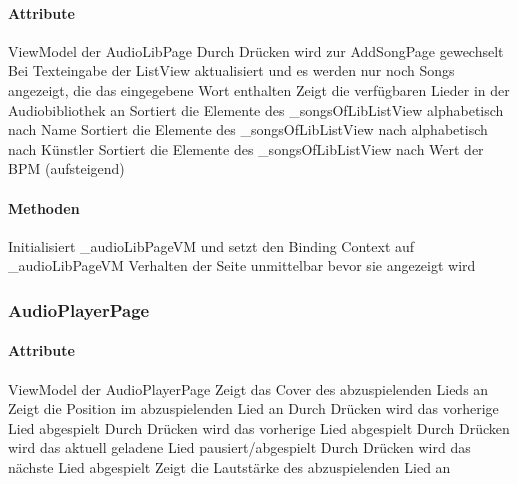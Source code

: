 \documentclass[../entwurf.tex]{subfiles}
\begin{document}
\paragraph{Attribute}
\begin{itemize}
	 ViewModel der AudioLibPage
	 Durch Drücken wird zur AddSongPage gewechselt
	 Bei Texteingabe der ListView aktualisiert und es werden nur noch Songs angezeigt, die das eingegebene Wort enthalten
	 Zeigt die verfügbaren Lieder in der Audiobibliothek an
	 Sortiert die Elemente des \_songsOfLibListView alphabetisch nach Name
	 Sortiert die Elemente des \_songsOfLibListView nach alphabetisch nach Künstler
	 Sortiert die Elemente des \_songsOfLibListView nach Wert der BPM (aufsteigend)
\end{itemize}

\paragraph{Methoden}
\begin{itemize}
	 Initialisiert \_audioLibPageVM und setzt den Binding Context 			auf \_audioLibPageVM
	 Verhalten der Seite unmittelbar bevor sie angezeigt wird
\end{itemize}

\subsubsection{AudioPlayerPage}

\paragraph{Attribute}
\begin{itemize}
	 ViewModel der AudioPlayerPage
	 Zeigt das Cover des abzuspielenden Lieds an
	 Zeigt die Position im abzuspielenden Lied an
	 Durch Drücken wird das vorherige Lied abgespielt
	 Durch Drücken wird das vorherige Lied abgespielt
	 Durch Drücken wird das aktuell geladene Lied pausiert/abgespielt
	 Durch Drücken wird das nächste Lied abgespielt	
	 Zeigt die Lautstärke des abzuspielenden Lied an
\end{itemize}
\end{document}

